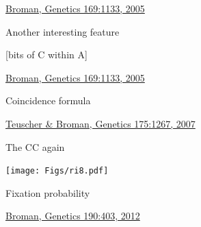 \documentclass[12pt]{article}
\newcommand{\headsize}{\fontsize{35}{35} \selectfont}
\newcommand{\smallsize}{\fontsize{25}{30} \selectfont}
\newcommand{\smallestsize}{\fontsize{18}{22} \selectfont}
\begin{document}
\vfill

\hfill {\smallestsize \color{myblue} \href{http://www.genetics.org/content/169/2/1133.full}{Broman, Genetics
169:1133, 2005}}

\vspace*{5mm}

\newpage

\headsize \color{myyellow}
\hfill \begin{minipage}{5.75in}
\centering
Another interesting feature
\end{minipage}

\vspace{15mm}

\color{mywhite}
\smallsize

[bits of C within A]

\vfill

\hfill {\smallestsize \color{myblue} \href{http://www.genetics.org/content/169/2/1133.full}{Broman, Genetics
169:1133, 2005}}

\vspace*{5mm}

\newpage

\headsize \color{myyellow}
\hfill \begin{minipage}{5.75in}
\centering
Coincidence formula
\end{minipage}

\vfill

\hfill {\smallestsize \color{myblue} \href{http://www.genetics.org/content/175/3/1267.full}{Teuscher \& Broman, Genetics
175:1267, 2007}}

\vspace*{5mm}

\newpage

\headsize \color{myyellow}
\hfill \begin{minipage}{5.75in}
\centering
The CC again
\end{minipage}

\vfill

\centerline{\texttt{[image: Figs/ri8.pdf]}}


\newpage

\headsize \color{myyellow}
\hfill \begin{minipage}{5.75in}
\centering
Fixation probability
\end{minipage}

\vfill

\hfill {\smallestsize \color{myblue} \href{http://www.genetics.org/content/190/2/403.full}{Broman, Genetics
190:403, 2012}}
\end{document}
